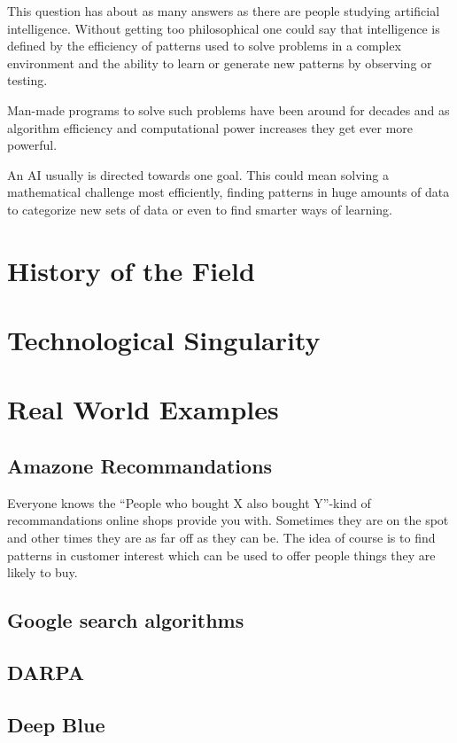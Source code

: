 \documentclass[DIV=calc, paper=a4, fontsize=11pt, twocolumn]{scrartcl}	 %
\begin{document}
This question has about as many answers as there are people studying artificial intelligence. Without getting too philosophical one could say that intelligence is defined by the efficiency of patterns used to solve problems in a complex environment and the ability to learn or generate new patterns by observing or testing.

Man-made programs to solve such problems have been around for decades and as algorithm efficiency and computational power increases they get ever more powerful.

An AI usually is directed towards one goal. This could mean solving a mathematical challenge most efficiently, finding patterns in huge amounts of data to categorize new sets of data or even to find smarter ways of learning.


\section*{History of the Field}

\section*{Technological Singularity}

\newpage
\section*{Real World Examples}

\subsection*{Amazone Recommandations}
Everyone knows the ``People who bought X also bought Y''-kind of recommandations online shops provide you with. Sometimes they are on the spot and other times they are as far off as they can be. The idea of course is to find patterns in customer interest which can be used to offer people things they are likely to buy.

\subsection*{Google search algorithms}
\subsection*{DARPA}
\subsection*{Deep Blue}
\end{document}
